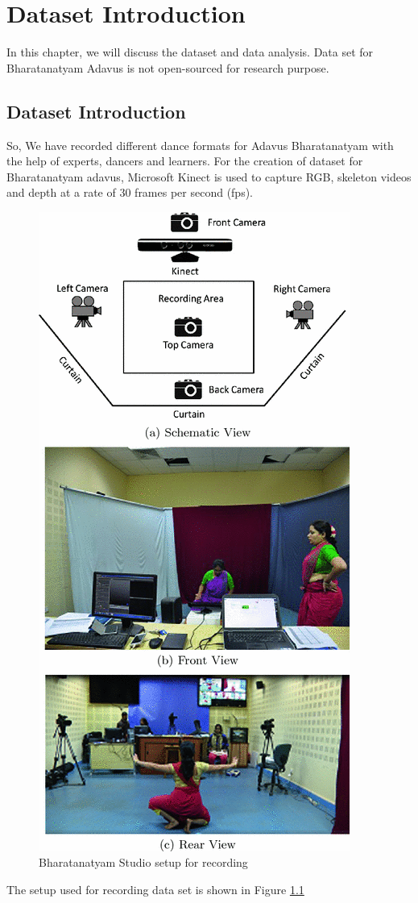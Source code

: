 \chapter{Dataset Introduction} %

\label{Chapter 3} 

In this chapter, we will discuss the dataset and data analysis. 
Data set for Bharatanatyam Adavus is not open-sourced for research purpose.

\section{Dataset Introduction}
 So, We have recorded different dance formats for Adavus Bharatanatyam with the help of experts, dancers and learners. For the creation of dataset for Bharatanatyam adavus, Microsoft Kinect \cite{wiki:002} is used to capture RGB, skeleton videos and depth at a rate of 30 frames per second (fps).
 
\begin{figure}[hbt!]
  \centering
  \includegraphics[scale= 0.5]{./Pictures/setup.png}
  \caption{Bharatanatyam Studio setup for recording}
  \label{fig:Ch03F001}
\end{figure}
The setup used for recording data set is shown in Figure \ref{fig:Ch03F001}

